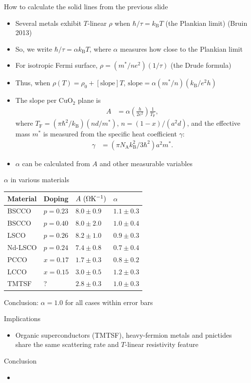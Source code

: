\documentclass[aspectratio=169]{beamer}
\begin{document}
\begin{frame}{How to calculate the solid lines from the previous slide}
\begin{itemize}
\item Several metals exhibit $T$-linear $\rho$ when $\hbar/\tau = k_\text{B}T$ (the Plankian limit) (Bruin 2013)
\item So, we write $\hbar/\tau = \alpha k_\text{B}T$, where $\alpha$ measures how close to the Plankian limit
\item For isotropic Fermi surface, $\rho = (m^{\ast}/ne^2)(1/\tau)$ (the Drude formula)
\item Thus, when $\rho(T) = \rho_0 + [\text{slope}] T$, $\text{slope} = \alpha (m^{\ast}/n)(k_\text{B}/e^2 h)$
\item The slope per CuO$_2$ plane is
\begin{align}
A &= \alpha \left(\frac{h}{2e^2}\right) \frac{1}{T_\text{F}},
\end{align}
where $T_\text{F} = (\pi \hbar^2/k_\text{B}) (nd/m^{\ast})$, $n = (1-x)/(a^2 d)$, and the effective mass $m^{\ast}$ is measured from the specific heat coefficient $\gamma$:
\begin{align}
\gamma &= (\pi N_{\text{A}} k_\text{B}^2 / 3 \hbar^2) a^2 m^{\ast}.
\end{align}
\item $\alpha$ can be calculated from $A$ and other measurable variables
\end{itemize}
\end{frame}

\begin{frame}{$\alpha$ in various materials}
\begin{table}
\begin{tabular}{llll}
Material & Doping & $A~(\rm{\Omega K^{-1}})$ & $\alpha$ \\
\hline
BSCCO & $p = 0.23$ & $8.0 \pm 0.9$ & $1.1 \pm 0.3$ \\
BSCCO & $p = 0.40$ & $8.0 \pm 2.0$ & $1.0 \pm 0.4$ \\
LSCO & $p = 0.26$ & $8.2 \pm 1.0$ & $0.9 \pm 0.3$ \\
Nd-LSCO & $p = 0.24$ & $7.4 \pm 0.8$ & $0.7 \pm 0.4$ \\
PCCO & $x = 0.17$ & $1.7 \pm 0.3$ & $0.8 \pm 0.2$ \\
LCCO & $x = 0.15$ & $3.0 \pm 0.5$ & $1.2 \pm 0.3$ \\
TMTSF & ? & $2.8 \pm 0.3$ & $1.0 \pm 0.3$ \\
\end{tabular}
\end{table}
Conclusion: $\alpha = 1.0$ for all cases within error bars
\end{frame}

\begin{frame}{Implications}
\begin{itemize}
\item Organic superconductors (TMTSF), heavy-fermion metals and pnictides share the same scattering rate and $T$-linear resistivity feature
\end{itemize}
\end{frame}

\begin{frame}{Conclusion}
\begin{itemize}
\item
\end{itemize}
\end{frame}
\end{document}

